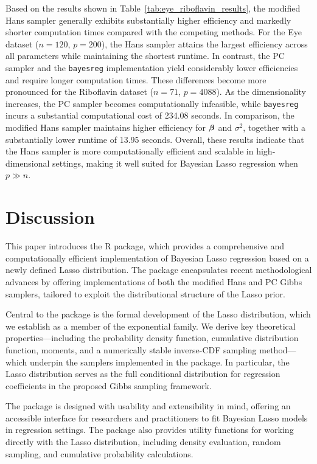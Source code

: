Based on the results shown in Table~\ref{tab:eye_riboflavin_results}, the modified 
Hans sampler generally exhibits substantially higher efficiency and markedly shorter 
computation times compared with the competing methods. For the Eye dataset ($n = 120$, 
$p = 200$), the Hans sampler attains the largest efficiency across all parameters 
while maintaining the shortest runtime. In contrast, the PC sampler and the 
\texttt{bayesreg} implementation yield considerably lower efficiencies and require 
longer computation times. These differences become more pronounced for the Riboflavin 
dataset ($n = 71$, $p = 4088$). As the dimensionality increases, the PC sampler 
becomes computationally infeasible, while \texttt{bayesreg} incurs a substantial 
computational cost of 234.08 seconds. In comparison, the modified Hans sampler 
maintains higher efficiency for ${\boldsymbol \beta}$ and $\sigma^2$, together with a 
substantially lower runtime of 13.95 seconds. Overall, these results indicate that 
the Hans sampler is more computationally efficient and scalable in high-dimensional 
settings, making it well suited for Bayesian Lasso regression when $p \gg n$.


\section{Discussion}
\label{Sec:discussion}
This paper introduces the  R package, which provides a comprehensive and computationally efficient implementation of Bayesian Lasso regression based on a newly defined Lasso distribution. The package encapsulates recent methodological advances by offering implementations of both the modified Hans and PC Gibbs samplers, tailored to exploit the distributional structure of the Lasso prior.

Central to the package is the formal development of the Lasso distribution, which we establish as a member of the exponential family. We derive key theoretical properties—including the probability density function, cumulative distribution function, moments, and a numerically stable inverse-CDF sampling method—which underpin the samplers implemented in the package. In particular, the Lasso distribution serves as the full conditional distribution for regression coefficients in the proposed Gibbs sampling framework.

The  package is designed with usability and extensibility in mind, offering an accessible interface for researchers and practitioners to fit Bayesian Lasso models in regression settings. The package also provides utility functions for working directly with the Lasso distribution, including density evaluation, random sampling, and cumulative probability calculations.

